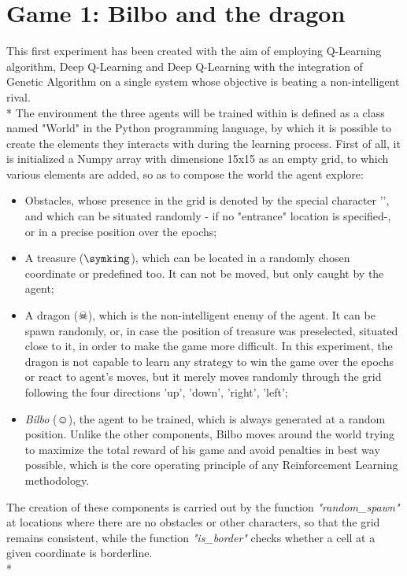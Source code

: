 \section{Game 1: Bilbo and the dragon}
This first experiment has been created with the aim of employing Q-Learning algorithm, Deep Q-Learning and Deep Q-Learning with the integration of Genetic Algorithm on a single system whose objective is beating a non-intelligent rival.\\*
The environment the three agents will be trained within is defined as a class named "World" in the Python programming language, by which it is possible to create the elements they interacts with during the learning process. First of all, it is initialized a Numpy array with dimensione 15x15 as an empty grid, to which various elements are added, so as to compose the world the agent explore:
\begin{itemize}
  \item Obstacles, whose presence in the grid is denoted by the special character '', and which can be situated randomly - if no "entrance" location is specified-, or in a precise position over the epochs;
  \item A treasure ($\symking$), which can be located in a randomly chosen coordinate or predefined too. It can not be moved, but only caught by the agent;
  \item A dragon ($\skull$), which is the non-intelligent enemy of the agent. It can be spawn randomly, or, in case the position of treasure was preselected, situated close to it, in order to make the game more difficult. In this experiment, the dragon is not capable to learn any strategy to win the game over the epochs or react to agent's moves, but it merely moves randomly through the grid following the four directions 'up', 'down', 'right', 'left';
  \item \textit{Bilbo} ($\smiley$), the agent to be trained, which is always generated at a random position. Unlike the other components, Bilbo moves around the world trying to maximize the total reward of his game and avoid penalties in best way possible, which is the core operating principle of any Reinforcement Learning methodology.
\end{itemize}
The creation of these components is carried out by the function \textit{"random\_spawn"} at locations where there are no obstacles or other characters, so that the grid remains consistent, while the function \textit{"is\_border"} checks whether a cell at a given coordinate is borderline.\\*
